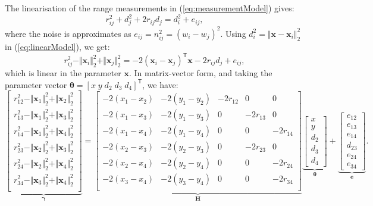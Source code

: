\documentclass[11pt]{article}
\newcommand{\bx}{\mathbf{x}}
\newcommand{\be}{\mathbf{e}}
\newcommand{\bH}{\mathbf{H}}
\newcommand{\TT}{\mathsf{T}}
\newcommand{\btheta}{\boldsymbol{\theta}}
\newcommand{\bgamma}{\boldsymbol{\gamma}}
\begin{document}
The linearisation of the range measurements in (\ref{eq:measurementModel}) gives:
\begin{equation}
	r_{ij}^{2} + d_{j}^{2} + 2r_{ij}d_{j} = d_{i}^{2} + e_{ij},
\label{eq:linearModel}
\end{equation}
where the noise is approximates as $e_{ij} = n_{ij}^{2} = (w_{i} - w_{j})^{2}$. Using $d_{i}^{2} = \Vert \bx - \bx_{i} \Vert_{2}^{2}$ in (\ref{eq:linearModel}), we get:
\begin{equation}
	r_{ij}^{2} - \Vert \bx_{i} \Vert_{2}^{2} + \Vert \bx_{j} \Vert_{2}^{2} = -2(\bx_{i} - \bx_{j})^{\TT} \bx - 2r_{ij}d_{j} + e_{ij},
\label{eq:blueSystem}
\end{equation}
which is linear in the parameter $\bx$. In matrix-vector form, and taking the parameter vector $\btheta = [x \; y \; d_{2} \; d_{3} \; d_{4}]^{\TT}$, we have:
\begin{equation}
	\underbrace{\begin{bmatrix}
		r^{2}_{12} - \Vert \bx_{1} \Vert_{2}^{2} + \Vert \bx_{2} \Vert_{2}^{2} \\
		r^{2}_{13} - \Vert \bx_{1} \Vert_{2}^{2} + \Vert \bx_{3} \Vert_{2}^{2} \\
		r^{2}_{14} - \Vert \bx_{1} \Vert_{2}^{2} + \Vert \bx_{4} \Vert_{2}^{2} \\
		r^{2}_{23} - \Vert \bx_{2} \Vert_{2}^{2} + \Vert \bx_{3} \Vert_{2}^{2} \\
		r^{2}_{24} - \Vert \bx_{2} \Vert_{2}^{2} + \Vert \bx_{4} \Vert_{2}^{2} \\
		r^{2}_{34} - \Vert \bx_{3} \Vert_{2}^{2} + \Vert \bx_{4} \Vert_{2}^{2} \\
	\end{bmatrix}}_{\bgamma} = 
	\underbrace{\begin{bmatrix}
		-2(x_{1} - x_{2}) & -2(y_{1} - y_{2}) & -2r_{12} & 0 & 0 \\
		-2(x_{1} - x_{3}) & -2(y_{1} - y_{3}) & 0 & -2r_{13} & 0 \\
		-2(x_{1} - x_{4}) & -2(y_{1} - y_{4}) & 0 & 0 & -2r_{14} \\
		-2(x_{2} - x_{3}) & -2(y_{2} - y_{3}) & 0 & -2r_{23} & 0 \\
		-2(x_{2} - x_{4}) & -2(y_{2} - y_{4}) & 0 & 0 & -2r_{24} \\
		-2(x_{3} - x_{4}) & -2(y_{3} - y_{4}) & 0 & 0 & -2r_{34} \\
	\end{bmatrix}}_{\bH}
	\underbrace{\begin{bmatrix}
		x \\ y \\ d_{2} \\ d_{3} \\ d_{4}
	\end{bmatrix}}_{\btheta} +
	\underbrace{\begin{bmatrix}
		e_{12} \\ e_{13} \\ e_{14} \\ d_{23} \\ e_{24} \\ e_{34}
	\end{bmatrix}}_{\be}.
\label{eq:blueModel}
\end{equation}
\end{document}
